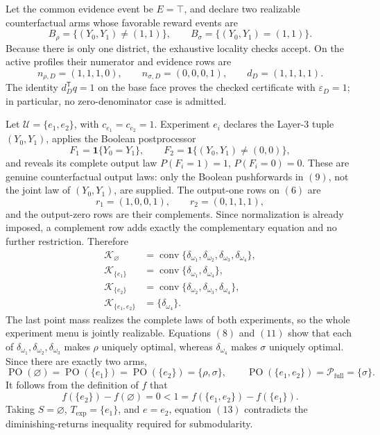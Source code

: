 Let the common evidence event be \(E=\top\), and declare two realizable
counterfactual arms whose favorable reward events are
\[
B_\rho=\{(Y_0,Y_1)\ne(1,1)\},
\qquad
B_\sigma=\{(Y_0,Y_1)=(1,1)\}.
\tag{7}
\]
Because there is only one district, the exhaustive locality checks accept.
On the active profiles their numerator and evidence rows are
\[
n_{\rho,D}=(1,1,1,0),\qquad
n_{\sigma,D}=(0,0,0,1),\qquad
d_D=(1,1,1,1).
\tag{8}
\]
The identity \(d_D^{\mathsf T}q=1\) on the base face proves the checked
certificate with \(\varepsilon_D=1\); in particular, no zero-denominator
case is admitted.

Let \(\mathcal U=\{e_1,e_2\}\), with \(c_{e_1}=c_{e_2}=1\).  Experiment
\(e_i\) declares the Layer-3 tuple \((Y_0,Y_1)\), applies the Boolean
postprocessor
\[
F_1=\mathbf 1\{Y_0=Y_1\},
\qquad
F_2=\mathbf 1\{(Y_0,Y_1)\ne(0,0)\},
\tag{9}
\]
and reveals its complete output law
\(P(F_i=1)=1\), \(P(F_i=0)=0\).  These are genuine counterfactual
output laws: only the Boolean pushforwards in \((9)\), not the joint law of
\((Y_0,Y_1)\), are supplied.  The output-one rows on \((6)\) are
\[
r_1=(1,0,0,1),
\qquad
r_2=(0,1,1,1),
\tag{10}
\]
and the output-zero rows are their complements.  Since normalization is
already imposed, a complement row adds exactly the complementary equation and
no further restriction.  Therefore
\[
\begin{aligned}
\mathcal K_{\varnothing}
 &=\operatorname{conv}\{\delta_{\omega_1},\delta_{\omega_2},
     \delta_{\omega_3},\delta_{\omega_4}\},\\
\mathcal K_{\{e_1\}}
 &=\operatorname{conv}\{\delta_{\omega_1},\delta_{\omega_4}\},\\
\mathcal K_{\{e_2\}}
 &=\operatorname{conv}\{\delta_{\omega_2},\delta_{\omega_3},
     \delta_{\omega_4}\},\\
\mathcal K_{\{e_1,e_2\}}
 &=\{\delta_{\omega_4}\}.
\end{aligned}
\tag{11}
\]
The last point mass realizes the complete laws of both experiments, so the
whole experiment menu is jointly realizable.  Equations \((8)\) and \((11)\)
show that each of \(\delta_{\omega_1},\delta_{\omega_2},
\delta_{\omega_3}\) makes \(\rho\) uniquely optimal, whereas
\(\delta_{\omega_4}\) makes \(\sigma\) uniquely optimal.  Since there are
exactly two arms,
\[
\operatorname{PO}(\varnothing)=
\operatorname{PO}(\{e_1\})=
\operatorname{PO}(\{e_2\})=\{\rho,\sigma\},
\qquad
\operatorname{PO}(\{e_1,e_2\})=
\mathcal P_{\mathrm{full}}=\{\sigma\}.
\tag{12}
\]
It follows from the definition of \(f\) that
\[
f(\{e_2\})-f(\varnothing)=0
<1=f(\{e_1,e_2\})-f(\{e_1\}).
\tag{13}
\]
Taking \(S=\varnothing\),
\(T_{\mathrm{exp}}=\{e_1\}\), and \(e=e_2\), equation \((13)\)
contradicts the diminishing-returns inequality required for submodularity.

